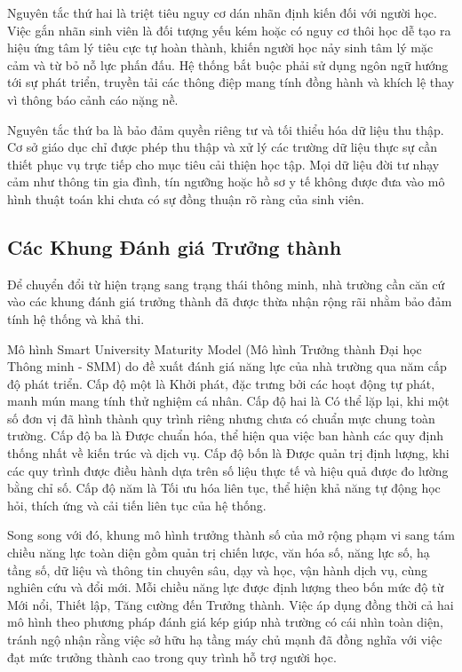Nguyên tắc thứ hai là triệt tiêu nguy cơ dán nhãn định kiến đối với người học. Việc gắn nhãn sinh viên là đối tượng yếu kém hoặc có nguy cơ thôi học dễ tạo ra hiệu ứng tâm lý tiêu cực tự hoàn thành, khiến người học nảy sinh tâm lý mặc cảm và từ bỏ nỗ lực phấn đấu. Hệ thống bắt buộc phải sử dụng ngôn ngữ hướng tới sự phát triển, truyền tải các thông điệp mang tính đồng hành và khích lệ thay vì thông báo cảnh cáo nặng nề.

Nguyên tắc thứ ba là bảo đảm quyền riêng tư và tối thiểu hóa dữ liệu thu thập. Cơ sở giáo dục chỉ được phép thu thập và xử lý các trường dữ liệu thực sự cần thiết phục vụ trực tiếp cho mục tiêu cải thiện học tập. Mọi dữ liệu đời tư nhạy cảm như thông tin gia đình, tín ngưỡng hoặc hồ sơ y tế không được đưa vào mô hình thuật toán khi chưa có sự đồng thuận rõ ràng của sinh viên.

\subsection{Các Khung Đánh giá Trưởng thành}
Để chuyển đổi từ hiện trạng sang trạng thái thông minh, nhà trường cần căn cứ vào các khung đánh giá trưởng thành đã được thừa nhận rộng rãi nhằm bảo đảm tính hệ thống và khả thi.

Mô hình Smart University Maturity Model (Mô hình Trưởng thành Đại học Thông minh - SMM) do \citet{uskov2018} đề xuất đánh giá năng lực của nhà trường qua năm cấp độ phát triển. Cấp độ một là Khởi phát, đặc trưng bởi các hoạt động tự phát, manh mún mang tính thử nghiệm cá nhân. Cấp độ hai là Có thể lặp lại, khi một số đơn vị đã hình thành quy trình riêng nhưng chưa có chuẩn mực chung toàn trường. Cấp độ ba là Được chuẩn hóa, thể hiện qua việc ban hành các quy định thống nhất về kiến trúc và dịch vụ. Cấp độ bốn là Được quản trị định lượng, khi các quy trình được điều hành dựa trên số liệu thực tế và hiệu quả được đo lường bằng chỉ số. Cấp độ năm là Tối ưu hóa liên tục, thể hiện khả năng tự động học hỏi, thích ứng và cải tiến liên tục của hệ thống.

Song song với đó, khung mô hình trưởng thành số của \citet{amiri2026} mở rộng phạm vi sang tám chiều năng lực toàn diện gồm quản trị chiến lược, văn hóa số, năng lực số, hạ tầng số, dữ liệu và thông tin chuyên sâu, dạy và học, vận hành dịch vụ, cùng nghiên cứu và đổi mới. Mỗi chiều năng lực được định lượng theo bốn mức độ từ Mới nổi, Thiết lập, Tăng cường đến Trưởng thành. Việc áp dụng đồng thời cả hai mô hình theo phương pháp đánh giá kép giúp nhà trường có cái nhìn toàn diện, tránh ngộ nhận rằng việc sở hữu hạ tầng máy chủ mạnh đã đồng nghĩa với việc đạt mức trưởng thành cao trong quy trình hỗ trợ người học.
